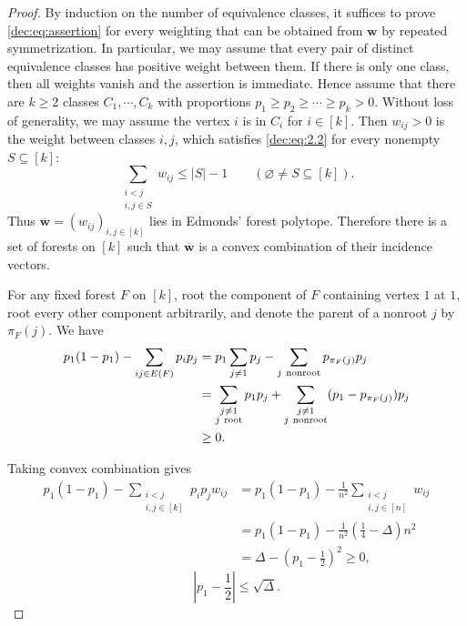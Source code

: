\documentclass[11pt]{article}
\numberwithin{equation}{section}
\theoremstyle{remark}
\begin{document}
\begin{proof}
By induction on the number of equivalence classes, it suffices to prove \eqref{dec:eq:assertion} for
every weighting that can be obtained from \(\mathbf{w}\) by repeated symmetrization. In particular,
we may assume that every pair of distinct equivalence classes has positive weight between them. 
If there is only one class, then all weights vanish and the assertion is immediate.
Hence assume that there are \(k\ge2\) classes \(C_1, \cdots, C_k\) with proportions \(p_1\ge p_2\ge\cdots\ge p_k>0\).
Without loss of generality, we may assume the vertex \(i\) is in \(C_i\) for \(i\in[k]\).
Then \(w_{ij}>0\) is the weight between classes \(i,j\), which satisfies \eqref{dec:eq:2.2} for every nonempty \(S\subseteq[k]\):
\begin{equation*}
 \sum_{\substack{i<j\\i,j\in S}}w_{ij}\le |S|-1
 \qquad(\varnothing\ne S\subseteq[k]).
\end{equation*}
Thus \(\overline{\mathbf{w}}=(w_{ij})_{i,j\in[k]}\) lies in Edmonds' forest polytope.
Therefore there is a set of forests on \([k]\) such that \(\overline{\mathbf{w}}\) is
a convex combination of their incidence vectors.

For any fixed forest \(F\) on \([k]\), root the component of \(F\) containing vertex \(1\) at \(1\), root every
other component arbitrarily, and denote the parent of a nonroot \(j\) by
\(\pi_F(j)\). We have
\begin{equation}\label{dec:eq:fixed forest}
\begin{aligned}
p_1(1-p_1) - \sum_{ij\in E(F)}p_ip_j &= p_1\sum_{j\ne1}p_j - \sum_{j\ {\rm nonroot}}p_{\pi_F(j)}p_j\\
&= \sum_{\substack{j\ne1\\j\ {\rm root}}}p_1p_j  +\sum_{\substack{j\ne1\\j\ {\rm nonroot}}}(p_1-p_{\pi_F(j)})p_j\\
&\ge0.
\end{aligned}
\end{equation}

Taking convex combination gives
\begin{equation}\label{dec:eq:conv comb}
\begin{aligned}
  p_1(1-p_1) - \sum_{\substack{i<j\\i,j\in [k]}}p_ip_jw_{ij} &= p_1(1-p_1) - \frac{1}{n^2}\sum_{\substack{i<j\\i,j\in [n]}}w_{ij}\\
  &= p_1(1-p_1) - \frac{1}{n^2}\left(\frac14-\Delta\right)n^2\\
  &= \Delta - \left(p_1 - \frac{1}{2}\right)^2 \ge 0,
\end{aligned}
\end{equation}
\begin{equation*}
\left|p_1-\frac12\right|\le\sqrt{\Delta}.
\end{equation*}


\end{proof}
\end{document}
